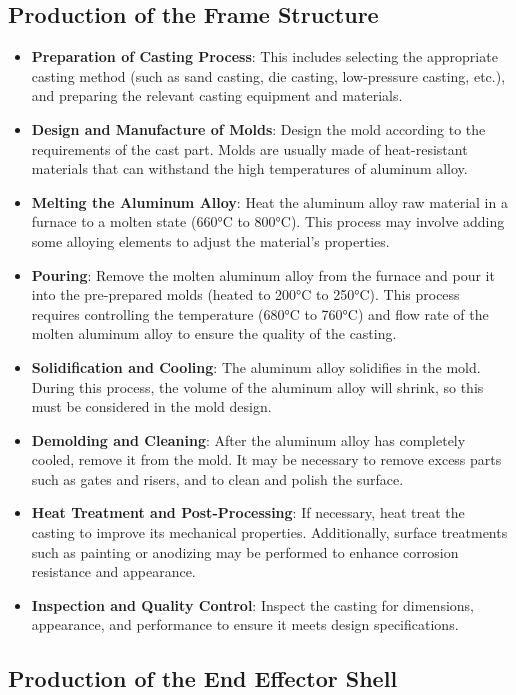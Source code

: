\documentclass[10pt, a4paper, twocolumn]{article}
\begin{document}
\subsection{Production of the Frame Structure}
\begin{itemize}
    \item \textbf{Preparation of Casting Process}: This includes selecting the appropriate casting method (such as sand casting, die casting, low-pressure casting, etc.), and preparing the relevant casting equipment and materials.
    \item \textbf{Design and Manufacture of Molds}: Design the mold according to the requirements of the cast part. Molds are usually made of heat-resistant materials that can withstand the high temperatures of aluminum alloy.
    \item \textbf{Melting the Aluminum Alloy}: Heat the aluminum alloy raw material in a furnace to a molten state (660°C to 800°C). This process may involve adding some alloying elements to adjust the material's properties.
    \item \textbf{Pouring}: Remove the molten aluminum alloy from the furnace and pour it into the pre-prepared molds (heated to 200°C to 250°C). This process requires controlling the temperature (680°C to 760°C) and flow rate of the molten aluminum alloy to ensure the quality of the casting.
    \item \textbf{Solidification and Cooling}: The aluminum alloy solidifies in the mold. During this process, the volume of the aluminum alloy will shrink, so this must be considered in the mold design.
    \item \textbf{Demolding and Cleaning}: After the aluminum alloy has completely cooled, remove it from the mold. It may be necessary to remove excess parts such as gates and risers, and to clean and polish the surface.
    \item \textbf{Heat Treatment and Post-Processing}: If necessary, heat treat the casting to improve its mechanical properties. Additionally, surface treatments such as painting or anodizing may be performed to enhance corrosion resistance and appearance.
    \item \textbf{Inspection and Quality Control}: Inspect the casting for dimensions, appearance, and performance to ensure it meets design specifications.
\end{itemize}

\subsection{Production of the End Effector Shell}
\end{document}
